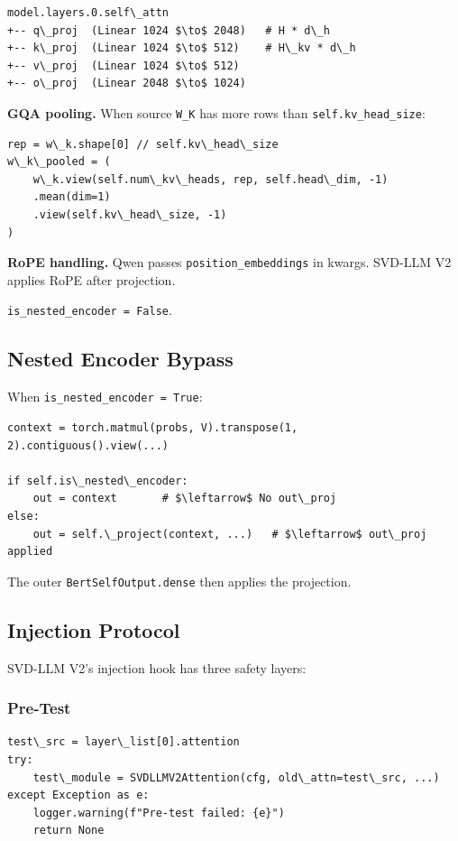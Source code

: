 \begin{lstlisting}
model.layers.0.self\_attn
+-- q\_proj  (Linear 1024 $\to$ 2048)   # H * d\_h
+-- k\_proj  (Linear 1024 $\to$ 512)    # H\_kv * d\_h
+-- v\_proj  (Linear 1024 $\to$ 512)
+-- o\_proj  (Linear 2048 $\to$ 1024)
\end{lstlisting}

\textbf{GQA pooling.} When source \texttt{W\_K} has more rows than \texttt{self.kv\_head\_size}:

\begin{lstlisting}
rep = w\_k.shape[0] // self.kv\_head\_size
w\_k\_pooled = (
    w\_k.view(self.num\_kv\_heads, rep, self.head\_dim, -1)
    .mean(dim=1)
    .view(self.kv\_head\_size, -1)
)
\end{lstlisting}

\textbf{RoPE handling.} Qwen passes \texttt{position\_embeddings} in kwargs. SVD-LLM V2 
applies RoPE after projection.

\texttt{is\_nested\_encoder = False}.

\subsection{Nested Encoder Bypass}

When \texttt{is\_nested\_encoder = True}:

\begin{lstlisting}
context = torch.matmul(probs, V).transpose(1, 2).contiguous().view(...)

if self.is\_nested\_encoder:
    out = context       # $\leftarrow$ No out\_proj
else:
    out = self.\_project(context, ...)   # $\leftarrow$ out\_proj applied
\end{lstlisting}

The outer \texttt{BertSelfOutput.dense} then applies the projection.

\subsection{Injection Protocol}

SVD-LLM V2's injection hook has three safety layers:

\subsubsection{Pre-Test}

\begin{lstlisting}
test\_src = layer\_list[0].attention
try:
    test\_module = SVDLLMV2Attention(cfg, old\_attn=test\_src, ...)
except Exception as e:
    logger.warning(f"Pre-test failed: {e}")
    return None
\end{lstlisting}

